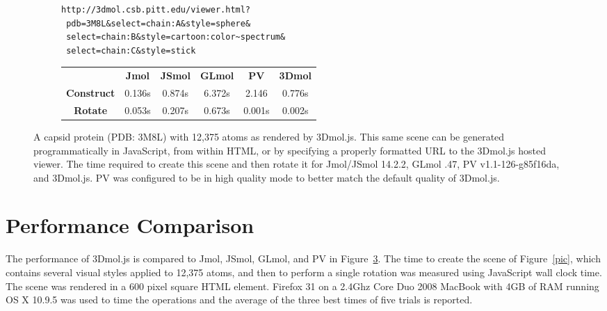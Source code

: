 \documentclass[]{bioinfo}
\begin{document}
\begin{figure}
\begin{minipage}[b]{\linewidth}
\begin{subfigure}[b]{\linewidth}
\end{subfigure} %
\begin{subfigure}[b]{\linewidth} \centering
\begin{verbatim}
http://3dmol.csb.pitt.edu/viewer.html?
 pdb=3M8L&select=chain:A&style=sphere&
 select=chain:B&style=cartoon:color~spectrum&
 select=chain:C&style=stick
\end{verbatim}
\caption{}\label{url}
\end{subfigure} %
\begin{subfigure}[b]{\linewidth} \centering
\begin{tabular}{cccccc}
 & \textbf{Jmol} & \textbf{JSmol} & \textbf{GLmol} &\textbf{PV} & \textbf{3Dmol} \\
\textbf{Construct} & 0.136s & 0.874s & 6.372s & 2.146 & 0.776s \\
\textbf{Rotate} & 0.053s & 0.207s & 0.673s & 0.001s & 0.002s
\end{tabular}
\caption{}\label{perf}
\end{subfigure}

\end{minipage}
\caption{ A capsid protein (PDB: 3M8L) with 12,375 atoms as rendered by 3Dmol.js.
This same scene can be generated  programmatically in JavaScript,  from
within HTML, or   by specifying a properly formatted URL to the 3Dmol.js hosted viewer.
 The time required to create this scene and then rotate it for Jmol/JSmol 14.2.2, GLmol .47, 
PV v1.1-126-g85f16da, and 3Dmol.js.  PV was configured to be in high quality mode to better match
the default quality of 3Dmol.js.
}
\end{figure}



\vspace{-10pt}
\section{Performance Comparison}

The performance of 3Dmol.js is compared to Jmol, JSmol, GLmol, and PV in Figure~\ref{perf}.
The time to create the scene of Figure~\ref{pic}, which contains several visual styles applied to 12,375 atoms,
and then to perform a single rotation was measured using JavaScript wall clock time.  The scene was rendered in a 600 pixel square HTML element.
 Firefox 31 on a 2.4Ghz Core Duo 2008 MacBook with 4GB of RAM running OS X 10.9.5
was used to time the operations and the average of the three best times of five trials is reported.
\end{document}
